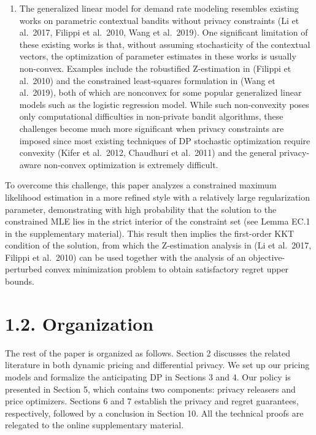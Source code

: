 \begin{enumerate}
\item
  The generalized linear model for demand rate modeling resembles existing works on parametric contextual bandits without privacy constraints (Li et al.~2017, Filippi et al.~2010, Wang et al.~2019). One significant limitation of these existing works is that, without assuming stochasticity of the contextual vectors, the optimization of parameter estimates in these works is usually non-convex. Examples include the robustified Z-estimation in (Filippi et al.~2010) and the constrained least-squares formulation in (Wang et al.~2019), both of which are nonconvex for some popular generalized linear models such as the logistic regression model. While such non-convexity poses only computational difficulties in non-private bandit algorithms, these challenges become much more significant when privacy constraints are imposed since most existing techniques of DP stochastic optimization require convexity (Kifer et al.~2012, Chaudhuri et al.~2011) and the general privacy-aware non-convex optimization is extremely difficult.
\end{enumerate}

To overcome this challenge, this paper analyzes a constrained maximum likelihood estimation in a more refined style with a relatively large regularization parameter, demonstrating with high probability that the solution to the constrained MLE lies in the strict interior of the constraint set (see Lemma EC.1 in the supplementary material). This result then implies the first-order KKT condition of the solution, from which the Z-estimation analysis in (Li et al.~2017, Filippi et al.~2010) can be used together with the analysis of an objective-perturbed convex minimization problem to obtain satisfactory regret upper bounds.

\section{1.2. Organization}\label{organization}

The rest of the paper is organized as follows. Section 2 discusses the related literature in both dynamic pricing and differential privacy. We set up our pricing models and formalize the anticipating DP in Sections 3 and 4. Our policy is presented in Section 5, which contains two components: privacy releasers and price optimizers. Sections 6 and 7 establish the privacy and regret guarantees, respectively, followed by a conclusion in Section 10. All the technical proofs are relegated to the online supplementary material.

